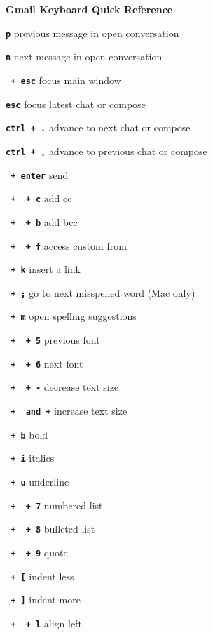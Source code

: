 \documentclass[11pt,letterpaper]{article}
\newcommand{\sck}[1]{\textbf{\texttt{#1}}}
\newcommand{\hdr}[1]{\vspace{1em}{\sffamily\bf \large #1}\vspace{0.5em}}
\begin{document}
\begin{center}
\textbf{\large Gmail Keyboard Quick Reference}
\end{center}


\hdr{Compose and Chat}

\sck{p} \dotfill previous message in open conversation

\sck{n} \dotfill next message in open conversation

\sck{\shift\ + esc} \dotfill focus main window

\sck{esc} \dotfill focus latest chat or compose

\sck{ctrl + .} \dotfill advance to next chat or compose

\sck{ctrl + ,} \dotfill advance to previous chat or compose

\sck{\cmd\ + enter} \dotfill send

\sck{\cmd\  + \shift\  + c} \dotfill add cc

\sck{\cmd\  + \shift\  + b} \dotfill add bcc

\sck{\cmd\ + \shift\  + f} \dotfill access custom from

\sck{\cmd\  + k} \dotfill insert a link

\sck{\cmd\ + ;} \dotfill go to next misspelled word (Mac only)

\sck{\cmd\ + m} \dotfill open spelling suggestions

\hdr{Formatting Text}

\sck{\cmd\ +  \shift\  + 5} \dotfill previous font

\sck{\cmd\  + \shift\  + 6} \dotfill next font

\sck{\cmd\  + \shift\  + -} \dotfill decrease text size

\sck{\cmd\  + \shift\  and +} \dotfill increase text size

\sck{\cmd\  + b} \dotfill bold

\sck{\cmd\ + i} \dotfill italics

\sck{\cmd\ + u} \dotfill underline

\sck{\cmd\  + \shift\  + 7} \dotfill numbered list

\sck{\cmd\  + \shift\  + 8} \dotfill bulleted list

\sck{\cmd\ + \shift\  + 9} \dotfill quote

\sck{\cmd\ + [} \dotfill indent less

\sck{\cmd\ + ]} \dotfill indent more

\sck{\cmd\ + \shift\  + l} \dotfill align left
\end{document}
